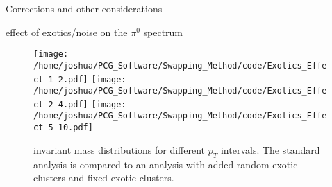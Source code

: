 \documentclass[ALICE]{ALICE_analysis_notes}
\begin{document}
\begin{section}{Corrections and other considerations}


\begin{subsection}{effect of exotics/noise on the $\pi^{0}$ spectrum}
	\label{sec:exotics}
	
	\begin{figure}[ht!]
		\centering
		\texttt{[image: /home/joshua/PCG\_Software/Swapping\_Method/code/Exotics\_Effect\_1\_2.pdf]}
		\texttt{[image: /home/joshua/PCG\_Software/Swapping\_Method/code/Exotics\_Effect\_2\_4.pdf]}
		\texttt{[image: /home/joshua/PCG\_Software/Swapping\_Method/code/Exotics\_Effect\_5\_10.pdf]}
		\caption{invariant mass distributions for different $p_{T}$ intervals. The standard analysis is compared to an analysis with added random exotic clusters and fixed-exotic clusters. }
		\label{fig:NCells_Exotics}
	\end{figure}


\end{subsection}
\end{section}
\end{document}
